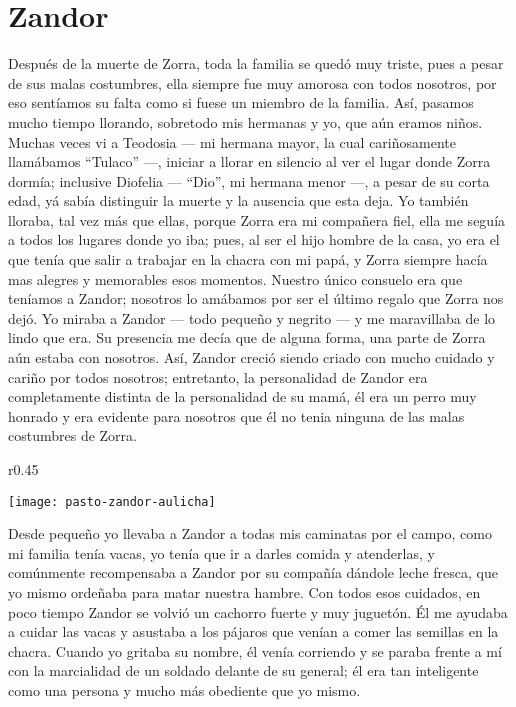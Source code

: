\cleardoublepage
\newpage
\ifdefined\EnableIncludeImages
\fi
\chapter{Zandor}
Después de la muerte de Zorra, toda la familia se quedó muy triste, pues a pesar de sus malas costumbres, ella siempre fue muy amorosa con todos nosotros, por eso sentíamos su falta como si fuese un miembro de la familia.
Así, pasamos mucho tiempo llorando, sobretodo mis hermanas y yo, que aún eramos niños.
Muchas veces vi a Teodosia --- mi hermana mayor, la cual cariñosamente llamábamos ``Tulaco'' ---, iniciar a llorar en silencio al ver el lugar donde Zorra dormía; inclusive Diofelia --- ``Dio'', mi hermana menor ---, a pesar de su corta edad, yá sabía distinguir la muerte y la ausencia que esta deja.
Yo también lloraba, tal vez más que ellas, porque Zorra era mi compañera fiel, ella me seguía a todos los lugares donde yo iba; pues, al ser el hijo hombre de la casa, yo era el que tenía que salir a trabajar en la chacra con mi papá, y Zorra siempre hacía mas alegres y memorables esos momentos.
Nuestro único consuelo era que teníamos a Zandor; nosotros lo amábamos por ser el último regalo que Zorra nos dejó.
Yo miraba a Zandor --- todo pequeño y negrito --- y me maravillaba de lo lindo que era. Su presencia me decía que de alguna forma, una parte de Zorra aún estaba con nosotros.
Así, Zandor creció siendo criado con mucho cuidado y cariño por todos nosotros;
entretanto, la personalidad de Zandor era completamente distinta de la personalidad de su mamá, él era un perro muy honrado y era evidente para nosotros que él no tenia ninguna de las malas costumbres de Zorra.
\ifdefined\EnableIncludeImages
\begin{wrapfigure}{r}{0.45\textwidth}
  \begin{center}
  \vspace{-20pt}
    \texttt{[image: pasto-zandor-aulicha]}
  \end{center}
  \vspace{-20pt}
\end{wrapfigure}
\fi
Desde pequeño yo llevaba a Zandor a todas mis caminatas por el campo, como mi familia tenía vacas, yo tenía que ir a darles comida y atenderlas, y comúnmente recompensaba a Zandor por su compañía dándole leche fresca, que yo mismo ordeñaba para matar nuestra hambre.
Con todos esos cuidados, en poco tiempo Zandor se volvió un cachorro fuerte y muy juguetón.
Él me ayudaba a cuidar las vacas y asustaba a los pájaros que venían a comer las semillas en la chacra. Cuando yo gritaba su nombre, él venía corriendo y se paraba frente a mí con la marcialidad de un soldado delante de su general; él era tan inteligente como una persona y mucho más obediente que yo mismo.

